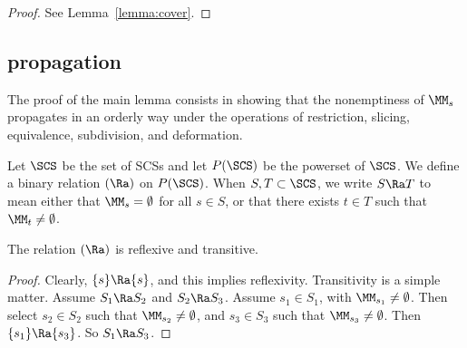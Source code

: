 \begin{proof} See Lemma~\ref{lemma:cover}.
\end{proof}

\subsection{propagation}

The proof of the main lemma consists in showing that the nonemptiness
of $\MM_s$ propagates in an orderly way under the operations of
restriction, slicing, equivalence, subdivision, and deformation.

\begin{definition}[$\Ra$] 
Let $\SCS$ be the set of SCSs
and let $P(\SCS)$ be the powerset of $\SCS$. 
We define a binary relation $(\Ra)$ on $P(\SCS)$.  When $S,T\subset \SCS$, we write
$S\Ra T$ to mean  either that $\MM_s=\emptyset$ for all $s\in S$,
or that there exists $t\in T$ such that $\MM_t\ne\emptyset$.
\end{definition}

\begin{lemma}
The relation $(\Ra)$  is reflexive and transitive.
\end{lemma}

\begin{proof}  Clearly, $\{s \}\Ra \{s\}$, and this implies reflexivity.
Transitivity is a simple matter.  Assume
$S_1\Ra S_2$ and $S_2\Ra S_3$.  Assume $s_1\in S_1$, with $\MM_{s_1}\ne \emptyset$.
Then select
$s_2\in S_2$ such that $\MM_{s_2}\ne\emptyset$, and $s_3\in S_3$ such
that $\MM_{s_3}\ne\emptyset$.  Then $\{s_1\}\Ra\{s_3\}$.  So $S_1\Ra S_3$.
\end{proof}

